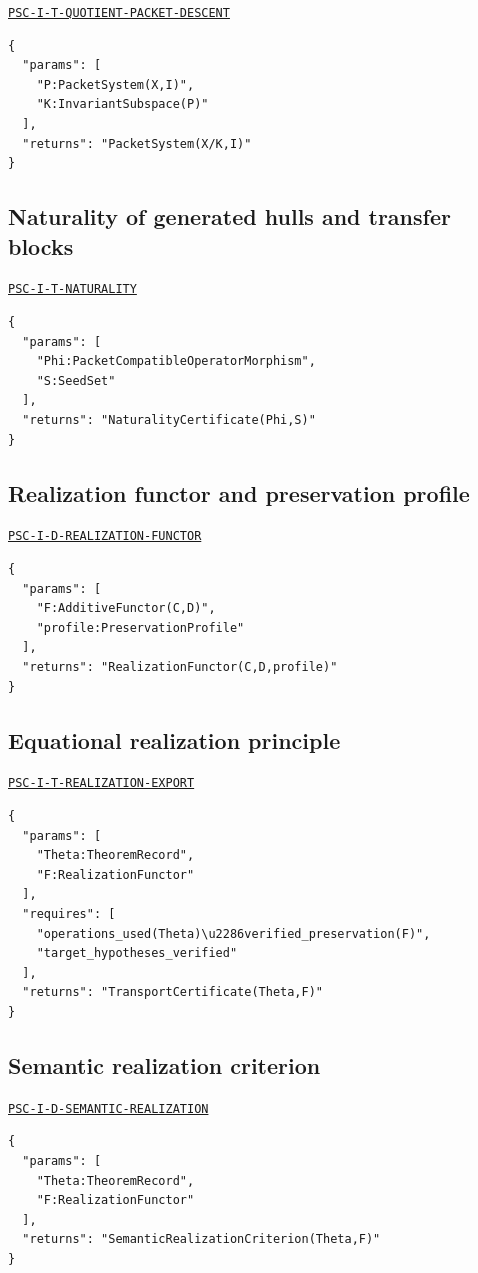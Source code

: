 \documentclass[a4paper,11pt]{article}
\begin{document}
\hyperref[rec:PSC-I-T-QUOTIENT-PACKET-DESCENT]{\nolinkurl{PSC-I-T-QUOTIENT-PACKET-DESCENT}}
\begin{lstlisting}
{
  "params": [
    "P:PacketSystem(X,I)",
    "K:InvariantSubspace(P)"
  ],
  "returns": "PacketSystem(X/K,I)"
}
\end{lstlisting}
\subsection*{Naturality of generated hulls and transfer blocks}
\hyperref[rec:PSC-I-T-NATURALITY]{\nolinkurl{PSC-I-T-NATURALITY}}
\begin{lstlisting}
{
  "params": [
    "Phi:PacketCompatibleOperatorMorphism",
    "S:SeedSet"
  ],
  "returns": "NaturalityCertificate(Phi,S)"
}
\end{lstlisting}
\subsection*{Realization functor and preservation profile}
\hyperref[rec:PSC-I-D-REALIZATION-FUNCTOR]{\nolinkurl{PSC-I-D-REALIZATION-FUNCTOR}}
\begin{lstlisting}
{
  "params": [
    "F:AdditiveFunctor(C,D)",
    "profile:PreservationProfile"
  ],
  "returns": "RealizationFunctor(C,D,profile)"
}
\end{lstlisting}
\subsection*{Equational realization principle}
\hyperref[rec:PSC-I-T-REALIZATION-EXPORT]{\nolinkurl{PSC-I-T-REALIZATION-EXPORT}}
\begin{lstlisting}
{
  "params": [
    "Theta:TheoremRecord",
    "F:RealizationFunctor"
  ],
  "requires": [
    "operations_used(Theta)\u2286verified_preservation(F)",
    "target_hypotheses_verified"
  ],
  "returns": "TransportCertificate(Theta,F)"
}
\end{lstlisting}
\subsection*{Semantic realization criterion}
\hyperref[rec:PSC-I-D-SEMANTIC-REALIZATION]{\nolinkurl{PSC-I-D-SEMANTIC-REALIZATION}}
\begin{lstlisting}
{
  "params": [
    "Theta:TheoremRecord",
    "F:RealizationFunctor"
  ],
  "returns": "SemanticRealizationCriterion(Theta,F)"
}
\end{lstlisting}
\end{document}
